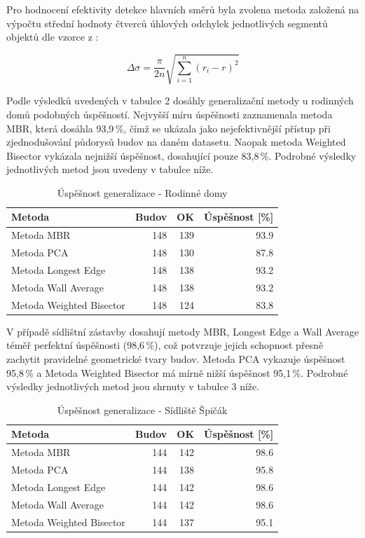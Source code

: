 \documentclass[a4paper,12pt]{article}
\begin{document}
Pro hodnocení efektivity detekce hlavních směrů byla zvolena metoda založená na výpočtu střední hodnoty čtverců úhlových odchylek jednotlivých segmentů objektů dle vzorce z \parencite{bayer_prednaska}:

\[
\Delta\sigma = \frac{\pi}{2n}\sqrt{\sum_{i=1}^{n}(r_{i}-r)^{2}}
\]


Podle výsledků uvedených v tabulce 2 dosáhly generalizační metody u rodinných domů podobných úspěšností. Nejvyšší míru úspěšnosti zaznamenala metoda MBR, která dosáhla 93,9\,\%, čímž se ukázala jako nejefektivnější přístup při zjednodušování půdorysů budov na daném datasetu. Naopak metoda Weighted Bisector vykázala nejnižší úspěšnost, dosahující pouze 83,8\,\%. Podrobné výsledky jednotlivých metod jsou uvedeny v tabulce níže.

\begin{table}[H]
\centering
\begin{tabular}{lrrr}
\hline
\textbf{Metoda} & \textbf{Budov} & \textbf{OK} & \textbf{Úspěšnost [\%]} \\
\hline
Metoda MBR            & 148 & 139 & 93.9 \\
Metoda PCA            & 148 & 130 & 87.8 \\
Metoda Longest Edge   & 148 & 138 & 93.2 \\
Metoda Wall Average   & 148 & 138 & 93.2 \\
Metoda Weighted Bisector & 148 & 124 & 83.8 \\
\hline
\end{tabular}
\caption{Úspěšnost generalizace - Rodinné domy}
\label{tab:generalization_family_houses}
\end{table}

V případě sídlištní zástavby dosahují metody MBR, Longest Edge a Wall Average téměř perfektní úspěšnosti (98,6\,\%), což potvrzuje jejich schopnost přesně zachytit pravidelné geometrické tvary budov. Metoda PCA vykazuje úspěšnost 95,8\,\% a Metoda Weighted Bisector má mírně nižší úspěšnost 95,1\,\%. Podrobné výsledky jednotlivých metod jsou shrnuty v tabulce 3 níže.

\begin{table}[H]
\centering
\begin{tabular}{lrrr}
\hline
\textbf{Metoda} & \textbf{Budov} & \textbf{OK} & \textbf{Úspěšnost [\%]} \\
\hline
Metoda MBR            & 144 & 142 & 98.6 \\
Metoda PCA            & 144 & 138 & 95.8 \\
Metoda Longest Edge   & 144 & 142 & 98.6 \\
Metoda Wall Average   & 144 & 142 & 98.6 \\
Metoda Weighted Bisector & 144 & 137 & 95.1 \\
\hline
\end{tabular}
\caption{Úspěšnost generalizace - Sídliště Špičák}
\label{tab:generalization_spicak}
\end{table}
\end{document}

